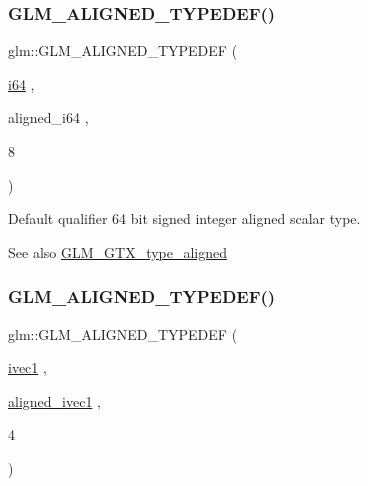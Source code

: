 \subsubsection{\texorpdfstring{G\+L\+M\+\_\+\+A\+L\+I\+G\+N\+E\+D\+\_\+\+T\+Y\+P\+E\+D\+E\+F()}{GLM\_ALIGNED\_TYPEDEF()}\hspace{0.1cm}{\footnotesize\ttfamily [48/209]}}
{\footnotesize\ttfamily glm\+::\+G\+L\+M\+\_\+\+A\+L\+I\+G\+N\+E\+D\+\_\+\+T\+Y\+P\+E\+D\+EF (\begin{DoxyParamCaption}\item[{\mbox{\hyperlink{group__gtc__type__precision_gac7a7eaad46064fc952b06df33689da23}{i64}}}]{,  }\item[{aligned\+\_\+i64}]{,  }\item[{8}]{ }\end{DoxyParamCaption})}

Default qualifier 64 bit signed integer aligned scalar type. \begin{DoxySeeAlso}{See also}
\mbox{\hyperlink{group__gtx__type__aligned}{G\+L\+M\+\_\+\+G\+T\+X\+\_\+type\+\_\+aligned}} 
\end{DoxySeeAlso}
\mbox{\label{group__gtx__type__aligned_gaaad735483450099f7f882d4e3a3569bd}} 
\subsubsection{\texorpdfstring{G\+L\+M\+\_\+\+A\+L\+I\+G\+N\+E\+D\+\_\+\+T\+Y\+P\+E\+D\+E\+F()}{GLM\_ALIGNED\_TYPEDEF()}\hspace{0.1cm}{\footnotesize\ttfamily [49/209]}}
{\footnotesize\ttfamily glm\+::\+G\+L\+M\+\_\+\+A\+L\+I\+G\+N\+E\+D\+\_\+\+T\+Y\+P\+E\+D\+EF (\begin{DoxyParamCaption}\item[{\mbox{\hyperlink{group__ext__vec1_ga946031cea0c22745848ebd873e6facb0}{ivec1}}}]{,  }\item[{\mbox{\hyperlink{group__gtc__type__aligned_gafe9657c41fa58e912f99e92284d79fce}{aligned\+\_\+ivec1}}}]{,  }\item[{4}]{ }\end{DoxyParamCaption})}

